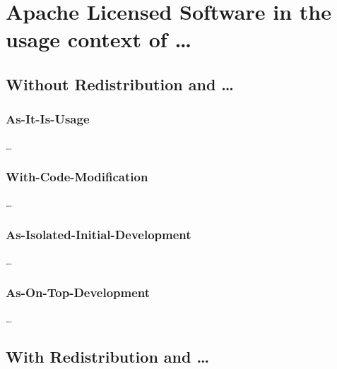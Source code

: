%
%
%
%
%



\section{Apache Licensed Software in the usage context of \ldots}
\subsection{Without Redistribution and \ldots}
\subsubsection{As-It-Is-Usage}
\ldots
\subsubsection{With-Code-Modification}
\ldots
\subsubsection{As-Isolated-Initial-Development}
\ldots
\subsubsection{As-On-Top-Development}
\ldots

\subsection{With Redistribution and \ldots}
